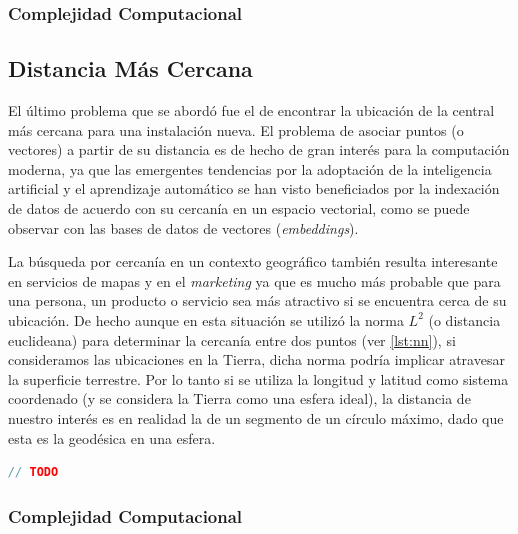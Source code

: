 \documentclass[12pt]{article}
\begin{document}
  \subsubsection{Complejidad Computacional}

  \subsection{Distancia Más Cercana}
  El último problema que se abordó fue el de encontrar la ubicación de la central más cercana para una instalación nueva. El problema de asociar puntos (o vectores) a partir de su distancia 
  es de hecho de gran interés para la computación moderna, ya que las emergentes tendencias por la adoptación de la inteligencia artificial y el aprendizaje automático se han visto beneficiados
  por la indexación de datos de acuerdo con su cercanía en un espacio vectorial, como se puede observar con las bases de datos de vectores (\textit{embeddings}). 
  
  La búsqueda por cercanía en un contexto geográfico también resulta interesante en servicios de mapas y en el \textit{marketing} ya que es mucho más probable que para una persona, un producto o 
  servicio sea más atractivo si se encuentra cerca de su ubicación. De hecho aunque en esta situación se utilizó la norma $L^{2}$ (o distancia euclideana) para determinar la cercanía entre dos puntos
  (ver \autoref{lst:nn}), si consideramos las ubicaciones en la Tierra, dicha norma podría implicar atravesar la superficie terrestre. Por lo tanto si se utiliza la longitud y latitud como sistema 
  coordenado (y se considera la Tierra como una esfera ideal), la distancia de nuestro interés es en realidad la de un segmento de un círculo máximo, dado que esta es la geodésica en una esfera.

  \begin{lstlisting}[language=cpp, caption={Ubicación más cercana}, label={lst:nn}]
// TODO
  \end{lstlisting}

  \subsubsection{Complejidad Computacional}
\end{document}
